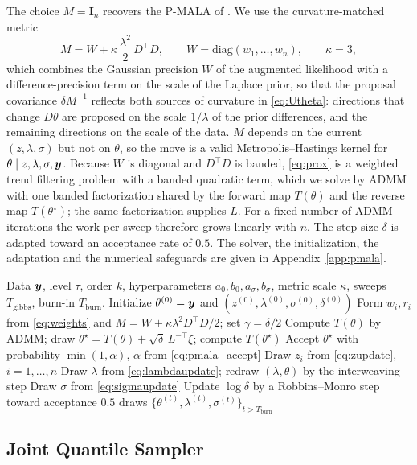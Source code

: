 The choice $M = \mathbf{I}_n$ recovers the P-MALA of \citet{pereyra2016proximal}. We use the curvature-matched metric
\begin{equation}
    M = W + \kappa\, \frac{\lambda^2}{2}\, D^\top D, \qquad W = \mathrm{diag}(w_1, \ldots, w_n), \qquad \kappa = 3,
    \label{eq:metric}
\end{equation}
which combines the Gaussian precision $W$ of the augmented likelihood with a difference-precision term on the scale of the Laplace prior, so that the proposal covariance $\delta M^{-1}$ reflects both sources of curvature in \eqref{eq:Utheta}: directions that change $D\theta$ are proposed on the scale $1/\lambda$ of the prior differences, and the remaining directions on the scale of the data. $M$ depends on the current $(z, \lambda, \sigma)$ but not on $\theta$, so the move is a valid Metropolis--Hastings kernel for $\theta \mid z, \lambda, \sigma, \bm{y}$. Because $W$ is diagonal and $D^\top D$ is banded, \eqref{eq:prox} is a weighted trend filtering problem with a banded quadratic term, which we solve by ADMM with one banded factorization shared by the forward map $T(\theta)$ and the reverse map $T(\theta^\star)$; the same factorization supplies $L$. For a fixed number of ADMM iterations the work per sweep therefore grows linearly with $n$. The step size $\delta$ is adapted toward an acceptance rate of $0.5$. The solver, the initialization, the adaptation and the numerical safeguards are given in Appendix~\ref{app:pmala}.

\begin{algorithm}[h!]
\caption{Bayesian-PMALA for a single quantile level $\tau$}
\label{alg:pmala}
\begin{algorithmic}[1]
\Require Data $\bm{y}$, level $\tau$, order $k$, hyperparameters $a_0, b_0, a_\sigma, b_\sigma$, metric scale $\kappa$, sweeps $T_{\mathrm{gibbs}}$, burn-in $T_{\mathrm{burn}}$.
\State Initialize $\theta^{(0)} = \bm{y}$ and $(z^{(0)}, \lambda^{(0)}, \sigma^{(0)}, \delta^{(0)})$ 
    \State Form $w_i, r_i$ from \eqref{eq:weights} and $M = W + \kappa\lambda^2 D^\top D/2$; set $\gamma = \delta/2$
    \State Compute $T(\theta)$ by ADMM; draw $\theta^\star = T(\theta) + \sqrt{\delta}\,L^{-\top}\xi$; compute $T(\theta^\star)$
    \State Accept $\theta^\star$ with probability $\min(1,\alpha)$, $\alpha$ from \eqref{eq:pmala_accept}
    \State Draw $z_i$ from \eqref{eq:zupdate}, $i = 1, \ldots, n$
    \State Draw $\lambda$ from \eqref{eq:lambdaupdate}; redraw $(\lambda, \theta)$ by the interweaving step
    \State Draw $\sigma$ from \eqref{eq:sigmaupdate}
    \State Update $\log\delta$ by a Robbins--Monro step toward acceptance $0.5$
\EndFor
\State \Return draws $\{\theta^{(t)}, \lambda^{(t)}, \sigma^{(t)}\}_{t > T_{\mathrm{burn}}}$
\end{algorithmic}
\end{algorithm}

\subsection{Joint Quantile Sampler}
\label{subsec:joint}

